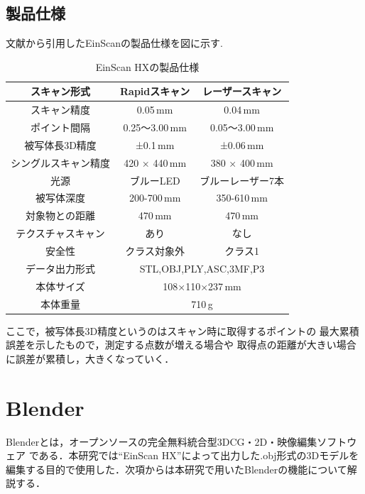 \documentclass{ltjsreport}
\begin{document}
		\subsection{製品仕様}
			文献\cite{ref:4}から引用したEinScanの製品仕様を図に示す.
			\begin{table}[H]
			\begin{center}
			\caption{EinScan HXの製品仕様}
			\label{tab:EinScan}
			\begin{tabular}{c|cc} \toprule
				スキャン形式&Rapidスキャン&レーザースキャン\\ \hline
				スキャン精度&0.05\,mm&0.04\,mm\\
				ポイント間隔&0.25～3.00\,mm&0.05～3.00\,mm\\
				被写体長3D精度&±0.1\,mm&±0.06\,mm\\
				シングルスキャン精度&420 × 440\,mm&380 × 400\,mm\\
				光源&ブルーLED&ブルーレーザー7本\\
				被写体深度&200-700\,mm&350-610\,mm\\
				対象物との距離&470\,mm&470\,mm\\
				テクスチャスキャン&あり&なし\\
				安全性&クラス対象外&クラス1\\ \hline
				データ出力形式&\multicolumn{2}{c}{STL,OBJ,PLY,ASC,3MF,P3}\\
				本体サイズ&\multicolumn{2}{c}{108×110×237\,mm}\\
				本体重量&\multicolumn{2}{c}{710\,g}\\
				\bottomrule
			\end{tabular}
			\end{center}
			\end{table}
			ここで，被写体長3D精度というのはスキャン時に取得するポイントの
			最大累積誤差を示したもので，測定する点数が増える場合や
			取得点の距離が大きい場合に誤差が累積し，大きくなっていく．

	\section{Blender}
		Blenderとは，オープンソースの完全無料統合型3DCG・2D・映像編集ソフトウェア
		である．本研究では``EinScan HX''によって出力した.obj形式の3Dモデルを
		編集する目的で使用した．次項からは本研究で用いたBlenderの機能について解説する．
\end{document}
